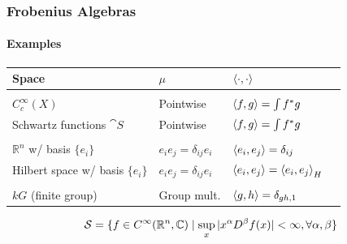 \documentclass{beamer}
\begin{document}
\begin{frame}
\frametitle{Frobenius Algebras}

\framesubtitle{Examples}



\begin{tabularx}{\textwidth}{lll>{\raggedright\arraybackslash}X}
\toprule
Space & $\mu$ & $\left\langle \cdot, \cdot \right\rangle$ 
\\
\midrule
\\
$C_c^{\infty}(X)$ & Pointwise & $\left\langle f,g \right\rangle = \int f^* g$ \\
Schwartz functions $\cat{S}$ & Pointwise & $\left\langle f,g \right\rangle = \int f^* g$
\\
\\
$\mathbb{R}^n$ w/ basis $\{ e_i \}$ & $e_i e_j = \delta_{ij} e_i$ & $\left\langle e_i,e_j \right\rangle = \delta_{ij}$ \\
Hilbert space w/ basis $\{ e_i \}$ & $e_i e_j = \delta_{ij} e_i$ & $\left\langle e_i,e_j \right\rangle = \left\langle e_i, e_j \right\rangle_H$  \\
\\
$kG$ (finite group) & Group mult. & $\left\langle g,h \right\rangle = \delta_{gh, 1}$ 
\\
\bottomrule
\end{tabularx}

\medskip


\begin{equation*}
\mathcal{S} = \{ f \in C^{\infty}(\mathbb{R}^n, \mathbb{C}) \mid \sup_{x} | x^\alpha D^\beta f(x) | < \infty, \forall \alpha, \beta \}
\end{equation*}



\end{frame}

\end{document}
